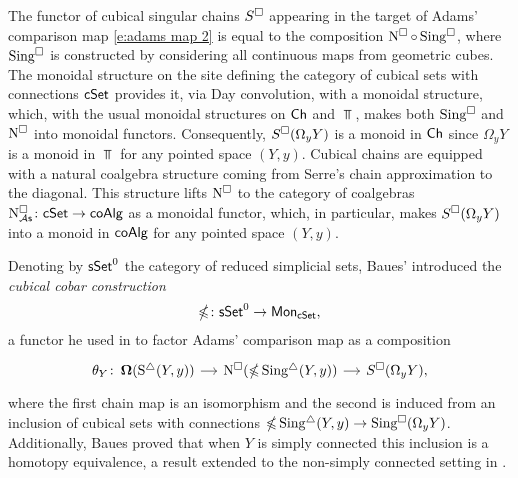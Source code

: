 The functor of cubical singular chains $S^\square$ appearing in the target of Adams' comparison map \eqref{e:adams map 2} is equal to the composition $\operatorname{N^{\square}} \circ \operatorname{Sing^{\square}}$, where $\operatorname{Sing^{\square}}$ is constructed by considering all continuous maps from geometric cubes.
The monoidal structure on the site defining the category of cubical sets with connections $\mathsf{cSet}$ provides it, via Day convolution, with a monoidal structure, which, with the usual monoidal structures on $\mathsf{Ch}$ and $\Top$, makes both $\operatorname{Sing^{\square}}$ and $\operatorname{N^{\square}}$ into monoidal functors.
Consequently, $S^\square(\Omega_y Y)$ is a monoid in $\mathsf{Ch}$ since $\Omega_y Y$ is a monoid in $\Top$ for any pointed space $(Y, y)$.
Cubical chains are equipped with a natural coalgebra structure coming from Serre's chain approximation to the diagonal.
This structure lifts $\operatorname{N^{\square}}$ to the category of coalgebras $\operatorname{N^{\square}_{{\mathcal{A}\mathsf{s}}}} \colon \mathsf{cSet} \to \mathsf{coAlg}$ as a monoidal functor, which, in particular, makes $S^\square(\Omega_y Y)$ into a monoid in $\mathsf{coAlg}$ for any pointed space $(Y, y)$.

Denoting by $\mathsf{sSet}^0$ the category of reduced simplicial sets, Baues' introduced the \textit{cubical cobar construction}
\begin{equation*}
\operatorname{\mathbb{\Omega}} \colon \mathsf{sSet}^0 \to \mathsf{Mon}_{\mathsf{cSet}},
\end{equation*}
a functor he used in \cite{baues1998hopf} to factor Adams' comparison map as a composition
\begin{equation} \label{e:baues factorization of adams map}
\begin{tikzcd}[column sep = small]
\theta_Y \colon \cobar(\sS(Y, y)) \arrow[r] &
\cchains(\ccobar \sSing(Y, y)) \arrow[r] &
S^{\cube}(\Omega_y Y),
\end{tikzcd}
\end{equation}
where the first chain map is an isomorphism and the second is induced from an inclusion of cubical sets with connections $\operatorname{\mathbb{\Omega}} \operatorname{Sing^{\triangle}}(Y, y) \to \operatorname{Sing^{\square}}(\Omega_y Y)$.
Additionally, Baues proved that when $Y$ is simply connected this inclusion is a homotopy equivalence, a result extended to the non-simply connected setting in \cite{rivera2019path}.

